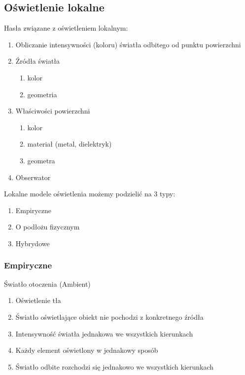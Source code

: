 \documentclass[12pt]{article}
\begin{document}
\subsection{Oświetlenie lokalne}
Hasła związane z oświetleniem lokalnym:

\begin{enumerate}
\item Obliczanie intensywności (koloru) światła odbitego od punktu powierzchni
\item Źródła światła
\begin{enumerate}
\item kolor
\item geometria
\end{enumerate}

\item Właściwości powierzchni
\begin{enumerate}
\item kolor
\item materiał (metal, dielektryk)
\item geometra
\end{enumerate}

\item Obserwator
\end{enumerate}

Lokalne modele oświetlenia możemy podzielić na 3 typy:
\begin{enumerate}
\item Empiryczne
\item O podłożu fizycznym
\item Hybrydowe
\end{enumerate}

\subsubsection{Empiryczne}

Światło otoczenia (Ambient)
\begin{enumerate}
\item Oświetlenie tła
\item Światło oświetlające obiekt nie pochodzi z konkretnego źródła
\item Intensywność światła jednakowa we wszystkich kierunkach
\item Każdy element oświetlony w jednakowy sposób
\item Światło odbite rozchodzi się jednakowo we wszystkich kierunkach
\end{enumerate}
\end{document}
